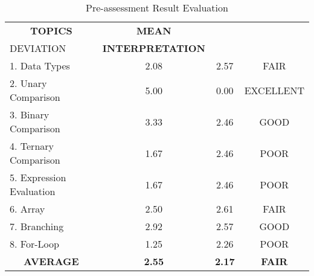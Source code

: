 \begin{longtable}[c]{lccc}
\caption{Pre-assessment Result Evaluation}
\label{table:pre_result_scale}\\ \hline
\multicolumn{1}{c}{\textbf{TOPICS}} & \textbf{MEAN} & \textbf{\begin{tabular}[c]{@{}c@{}}STANDARD\\ DEVIATION\end{tabular}} & \textbf{INTERPRETATION} \\ \hline
\endfirsthead
%
\endhead
%
1. Data Types                        & 2.08          & 2.57                                                                  & FAIR                    \\
2. Unary Comparison                  & 5.00             & 0.00                                                                     & EXCELLENT               \\
3. Binary Comparison                 & 3.33          & 2.46                                                                  & GOOD                    \\
4. Ternary Comparison                & 1.67          & 2.46                                                                  & POOR                    \\
5. Expression Evaluation             & 1.67          & 2.46                                                                  & POOR                    \\
6. Array                             & 2.50           & 2.61                                                                  & FAIR                    \\
7. Branching                         & 2.92          & 2.57                                                                  & GOOD                    \\
8. For-Loop                         & 1.25          & 2.26                                                                  & POOR                    \\
\multicolumn{1}{c}{\textbf{AVERAGE}} & \textbf{2.55} & \textbf{2.17}                                                         & \textbf{FAIR}          \\ \hline
\end{longtable}
